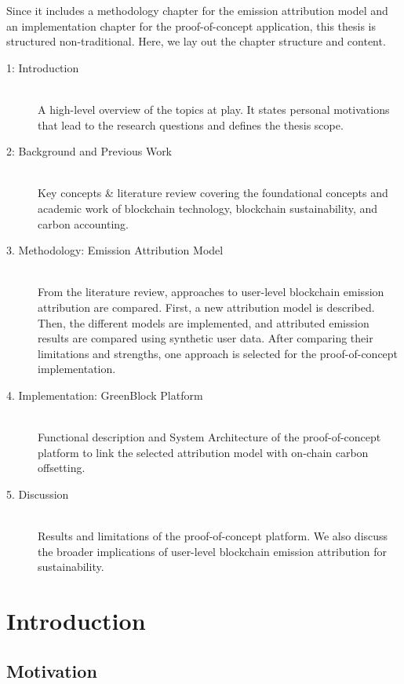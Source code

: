 \documentclass[11pt]{report}
\begin{document}
Since it includes a methodology chapter for the emission attribution model and an implementation chapter for the proof-of-concept application, this thesis is structured non-traditional. Here, we lay out the chapter structure and content.
\begin{description}
    \item [1: Introduction] \hfill \\
          A high-level overview of the topics at play. It states personal motivations that lead to the research questions and defines the thesis scope.
    \item [2: Background and Previous Work] \hfill \\
          Key concepts \& literature review covering the foundational concepts and academic work of blockchain technology, blockchain sustainability, and carbon accounting.
    \item [3. Methodology: Emission Attribution Model] \hfill \\
          From the literature review, approaches to user-level blockchain emission attribution are compared. First, a new attribution model is described. Then, the different models are implemented, and attributed emission results are compared using synthetic user data. After comparing their limitations and strengths, one approach is selected for the proof-of-concept implementation.
    \item [4. Implementation: GreenBlock Platform] \hfill \\
          Functional description and System Architecture of the proof-of-concept platform to link the selected attribution model with on-chain carbon offsetting.
    \item [5. Discussion] \hfill \\
          Results and limitations of the proof-of-concept platform. We also discuss the broader implications of user-level blockchain emission attribution for sustainability.

\end{description}

\printacronyms

\chapter{Introduction}

\section{Motivation}
\end{document}

